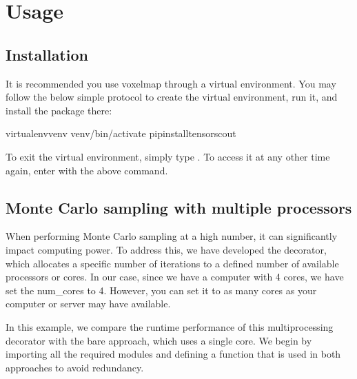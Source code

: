 \documentclass[letterpaper,10pt,english]{sphinxmanual}
\begin{document}
\section{Usage}
\label{\detokenize{usage:usage}}\label{\detokenize{usage::doc}}

\subsection{Installation}
\label{\detokenize{usage:installation}}\label{\detokenize{usage:id1}}
\sphinxAtStartPar
It is recommended you use voxelmap through a virtual environment. You may follow the below simple protocol to create the virtual environment, run it, and install the package there:

\begin{sphinxVerbatim}[commandchars=\\\{\}]
virtualenvvenv
venv/bin/activate
 pipinstalltensorscout
\end{sphinxVerbatim}

\sphinxAtStartPar
To exit the virtual environment, simply type . To access it at any other time again, enter with the above  command.


\subsection{Monte Carlo sampling with multiple processors}
\label{\detokenize{usage:monte-carlo-sampling-with-multiple-processors}}
\sphinxAtStartPar
When performing Monte Carlo sampling at a high number, it can significantly impact computing power.
To address this, we have developed the  decorator, which allocates a specific number of iterations to
a defined number of available processors or cores. In our case, since we have a computer with 4 cores, we have set
the num\_cores to 4. However, you can set it to as many cores as your computer or server may have available.

\sphinxAtStartPar
In this example, we compare the runtime performance of this multiprocessing decorator with the bare approach,
which uses a single core. We begin by importing all the required modules and defining a function that is used
in both approaches to avoid redundancy.
\end{document}
